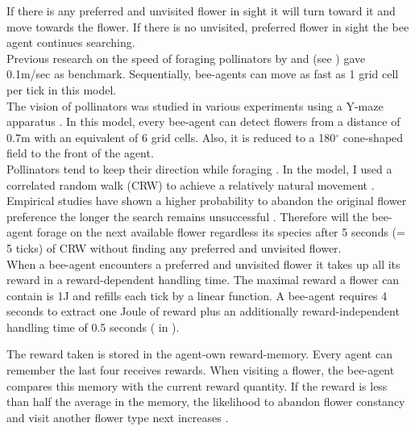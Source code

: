 If there is any preferred and unvisited flower in sight it will turn toward it and move towards the flower. If there is no unvisited, preferred flower in sight the bee agent continues searching. \\

Previous research on the speed of foraging pollinators by \cite{essenberg2012explaining} and \cite{kunin1991few} (see  \citealt{kunin1996pollinator}) gave 0.1m/sec as benchmark. Sequentially, bee-agents can move as fast as 1 grid cell per tick in this model. \\

The vision of pollinators was studied in various experiments using a Y-maze apparatus \citep{dyer2008comparative, wertlen2008detection, ne2001effect}. In this model, every bee-agent can detect flowers from a distance of 0.7m with an equivalent of 6 grid cells. Also, it is reduced to a 180$^{\circ}$ cone-shaped field to the front of the agent.\\

Pollinators tend to keep their direction while foraging \citep{waddington1980flight}. In the model, I used a correlated random walk (CRW) to achieve a relatively natural  movement \citep{bartumeus2005animal, codling2008random,  pyke1992flight, viswanathan2008levy}. \\

Empirical studies have shown a higher probability to abandon the original flower preference the longer the search remains unsuccessful \citep{chittka1997foraging}. Therefore will the bee-agent forage on the next available flower regardless its species after 5 seconds (= 5 ticks) of CRW without finding any preferred and unvisited flower. \\

When a bee-agent encounters a preferred and unvisited flower it takes up all its reward in a reward-dependent handling time. The maximal reward a flower can contain is 1J and refills each tick by a linear function.  A bee-agent requires 4 seconds to extract one Joule of reward plus an additionally reward-independent handling time of 0.5 seconds (\citealt{roubik1992ecology} in  \citealt{kunin1996pollinator}). 

The reward taken is stored in the agent-own reward-memory. Every agent can remember the last four receives rewards. When visiting a flower, the bee-agent compares this memory with the current reward quantity. If the reward is less than half the average in the memory, the likelihood to abandon flower constancy and visit another flower type next increases \citep{chittka1997foraging, keasar1996innate}. 

